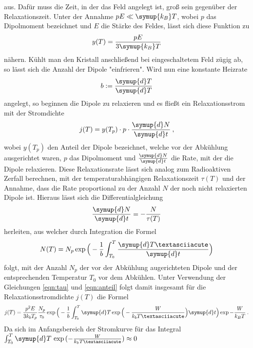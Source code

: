 aus. Dafür muss die Zeit, in der das Feld angelegt ist, groß sein gegenüber
der Relaxationszeit.
Unter der Annahme $pE\ll\symup{k_B}T$, wobei $p$ das Dipolmoment bezeichnet und $E$ die
Stärke des Feldes, lässt sich diese Funktion zu
\begin{equation}
  y(T)=\frac{pE}{3\symup{k_B}T}
  \label{eqn:anteil}
\end{equation}
nähern. Kühlt man den Kristall anschließend bei eingeschaltetem Feld zügig ab, so lässt sich
die Anzahl der Dipole "einfrieren". Wird nun eine konstante Heizrate
\begin{equation}
  b:=\frac{\symup{d}T}{\symup{d}T}
  \label{eqn:hrate}
\end{equation}
angelegt, so beginnen die Dipole zu relaxieren und es fließt ein Relaxationsstrom mit der Stromdichte
\begin{equation}
  j(T)=y(T_p)\cdot p \cdot \frac{\symup{d}N}{\symup{d}t} \:,
\end{equation}
wobei $y(T_p)$ den Anteil der Dipole bezeichnet, welche vor der Abkühlung ausgerichtet waren,
$p$ das Dipolmoment und $\frac{\symup{d}N}{\symup{d}t}$ die Rate, mit der die Dipole relaxieren.
Diese Relaxationsrate lässt sich analog zum Radioaktiven Zerfall berechnen, mit der temperaturabhängigen
Relaxationszeit $\tau(T)$ und der Annahme, dass die Rate proportional zu der Anzahl $N$ der noch nicht relaxierten
Dipole ist. Hieraus lässt sich die Differentialgleichung
\begin{equation}
  \frac{\symup{d}N}{\symup{d}t}=-\frac{N}{\tau(T)}
  \label{eqn:DGL}
\end{equation}
herleiten, aus welcher durch Integration die Formel
\begin{equation}
  N(T)=N_p \exp{\Big(-\frac{1}{b}\int_{T_0}^{T} \frac{\symup{d}T´}{\symup{d}t}\Big)}
\end{equation}
folgt, mit der Anzahl $N_p$ der vor der Abkühlung augerichteten Dipole
und der entsprechenden Temperatur $T_0$ vor dem Abkühlen. Unter Verwendung
der Gleichungen \eqref{eqn:tau} und \eqref{eqn:anteil} folgt damit insgesamt für die
Relaxationsstromdichte $j(T)$ die Formel
\begin{equation}
  j(T)=\frac{p^2E}{3k_bT_p}\frac{N_p}{\tau_0}  \exp{\Big(-\frac{1}{b}\int_{T_0}^{T}
  \symup{d}T\exp{\Big(-\frac{W}{k_bT´}\Big)}{\symup{d}t}\Big)}
  \exp{-\frac{W}{k_BT}} \:.
  \label{eqn:stromd}
\end{equation}
Da sich im Anfangsbereich der Stromkurve für das Integral $\int_{T_0}^{T} \symup{d}T\,\exp{(-\frac{W}{k_bT´})} \approx 0$
